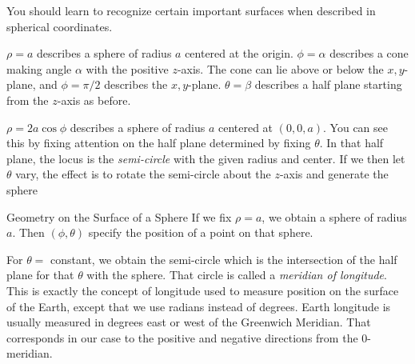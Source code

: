 You should learn to recognize certain important surfaces when
described in spherical coordinates.

\nextex
{}
$\rho = a$ describes a sphere of radius $a$ centered at the origin.
\endexample
\nextex
{}
$\phi = \alpha$ describes a cone making angle $\alpha$ with the
positive $z$-axis.  The cone can lie above or below the $x,y$-plane,
and $\phi = \pi/2$ describes the $x,y$-plane.
\endexample
\nextex
{}
$\theta = \beta$ describes a half plane starting from the $z$-axis
as before.
\endexample
\nextex
\xdef\OffSph{\en}
\medskip
\centerline{}
\medskip
{}
$\rho = 2a\cos\phi$ describes a sphere of radius
$a$ centered at $(0,0,a)$.  You can see this by fixing attention
on the half plane determined by fixing $\theta$.  In that half
plane, the locus is the {\it semi-circle\/} with the given
radius and center.  If we then let $\theta$ vary, the effect is
to rotate the semi-circle about the $z$-axis and generate the
sphere
\medskip
\centerline{}
\medskip
\endexample

\subhead Geometry on the Surface of a Sphere \endsubhead
If we fix $\rho = a$, we obtain a sphere of radius $a$.
Then $(\phi, \theta)$ specify the position of a point on
that sphere.  

For $\theta = $ constant, we obtain the semi-circle
which is the intersection of the half plane for that $\theta$
with the sphere.  That circle is called a {\it meridian of
longitude}.  This is exactly the concept of longitude used to
%
%
measure position on the surface of the Earth, except that we
use radians instead of degrees.  Earth longitude is usually
measured in degrees east or west of the Greenwich Meridian.
That corresponds in our case to the positive and negative
directions from the 0-meridian.  


